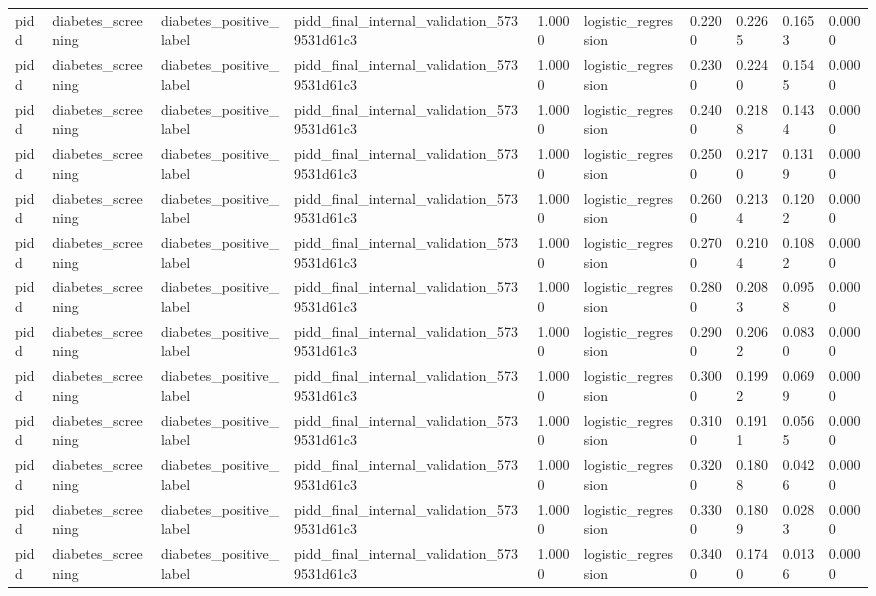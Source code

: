 \begin{tabular}{llllllllll}
pidd & diabetes\_screening & diabetes\_positive\_label & pidd\_final\_internal\_validation\_5739531d61c3 & 1.0000 & logistic\_regression & 0.2200 & 0.2265 & 0.1653 & 0.0000 \\
pidd & diabetes\_screening & diabetes\_positive\_label & pidd\_final\_internal\_validation\_5739531d61c3 & 1.0000 & logistic\_regression & 0.2300 & 0.2240 & 0.1545 & 0.0000 \\
pidd & diabetes\_screening & diabetes\_positive\_label & pidd\_final\_internal\_validation\_5739531d61c3 & 1.0000 & logistic\_regression & 0.2400 & 0.2188 & 0.1434 & 0.0000 \\
pidd & diabetes\_screening & diabetes\_positive\_label & pidd\_final\_internal\_validation\_5739531d61c3 & 1.0000 & logistic\_regression & 0.2500 & 0.2170 & 0.1319 & 0.0000 \\
pidd & diabetes\_screening & diabetes\_positive\_label & pidd\_final\_internal\_validation\_5739531d61c3 & 1.0000 & logistic\_regression & 0.2600 & 0.2134 & 0.1202 & 0.0000 \\
pidd & diabetes\_screening & diabetes\_positive\_label & pidd\_final\_internal\_validation\_5739531d61c3 & 1.0000 & logistic\_regression & 0.2700 & 0.2104 & 0.1082 & 0.0000 \\
pidd & diabetes\_screening & diabetes\_positive\_label & pidd\_final\_internal\_validation\_5739531d61c3 & 1.0000 & logistic\_regression & 0.2800 & 0.2083 & 0.0958 & 0.0000 \\
pidd & diabetes\_screening & diabetes\_positive\_label & pidd\_final\_internal\_validation\_5739531d61c3 & 1.0000 & logistic\_regression & 0.2900 & 0.2062 & 0.0830 & 0.0000 \\
pidd & diabetes\_screening & diabetes\_positive\_label & pidd\_final\_internal\_validation\_5739531d61c3 & 1.0000 & logistic\_regression & 0.3000 & 0.1992 & 0.0699 & 0.0000 \\
pidd & diabetes\_screening & diabetes\_positive\_label & pidd\_final\_internal\_validation\_5739531d61c3 & 1.0000 & logistic\_regression & 0.3100 & 0.1911 & 0.0565 & 0.0000 \\
pidd & diabetes\_screening & diabetes\_positive\_label & pidd\_final\_internal\_validation\_5739531d61c3 & 1.0000 & logistic\_regression & 0.3200 & 0.1808 & 0.0426 & 0.0000 \\
pidd & diabetes\_screening & diabetes\_positive\_label & pidd\_final\_internal\_validation\_5739531d61c3 & 1.0000 & logistic\_regression & 0.3300 & 0.1809 & 0.0283 & 0.0000 \\
pidd & diabetes\_screening & diabetes\_positive\_label & pidd\_final\_internal\_validation\_5739531d61c3 & 1.0000 & logistic\_regression & 0.3400 & 0.1740 & 0.0136 & 0.0000 \\

\end{tabular}
